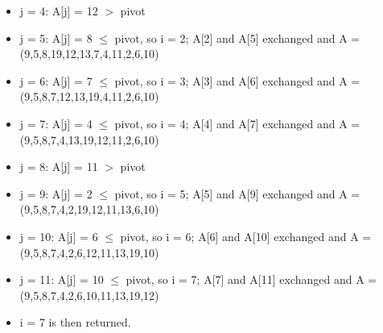 \documentclass[11pt]{article}
\begin{document}
\begin{enumerate}
\begin{itemize}
        \item j = 4: A[j] = 12 $>$ pivot
        \item j = 5: A[j] = 8 $\leq$ pivot, so i = 2; A[2] and A[5] exchanged and A = (9,5,8,19,12,13,7,4,11,2,6,10)
        \item j = 6: A[j] = 7 $\leq$ pivot, so i = 3; A[3] and A[6] exchanged and A = (9,5,8,7,12,13,19,4,11,2,6,10)
        \item j = 7: A[j] = 4 $\leq$ pivot, so i = 4; A[4] and A[7] exchanged and A = (9,5,8,7,4,13,19,12,11,2,6,10)
        \item j = 8: A[j] = 11 $>$ pivot
        \item j = 9: A[j] = 2 $\leq$ pivot, so i = 5; A[5] and A[9] exchanged and A = (9,5,8,7,4,2,19,12,11,13,6,10)
        \item j = 10: A[j] = 6 $\leq$ pivot, so i = 6; A[6] and A[10] exchanged and A = (9,5,8,7,4,2,6,12,11,13,19,10)
        \item j = 11: A[j] = 10 $\leq$ pivot, so i = 7; A[7] and A[11] exchanged and A = (9,5,8,7,4,2,6,10,11,13,19,12)
        \item i = 7 is then returned.
    \end{itemize}


\end{enumerate}
\end{document}
